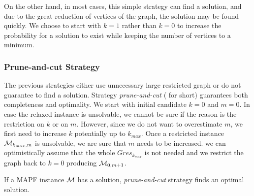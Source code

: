 

On the other hand, in most cases, this simple strategy can find a solution, and due to the great reduction of vertices of the graph, the solution may be found quickly. We choose to start with $k=1$ rather than $k=0$ to increase the probability for a solution to exist while keeping the number of vertices to a minimum.



\subsubsection{Prune-and-cut Strategy}

The previous strategies either use unnecessary large restricted graph or do not guarantee to find a solution. Strategy \emph{prune-and-cut} (\ssp{} for short) guarantees both completeness and optimality. We start with initial candidate $k=0$ and $m=0$. In case the relaxed instance is unsolvable, we cannot be sure if the reason is the restriction on $k$ or on $m$. However, since we do not want to overestimate $m$, we first need to increase $k$ potentially up to $k_{max}$. Once a restricted instance ${\mathcal{M}}_{k_{max},m}$ is unsolvable, we are sure that $m$ needs to be increased. %
we can optimistically assume that the whole $Gres_{k_{max}}$ is not needed and we restrict the graph back to $k=0$ producing ${\mathcal{M}}_{0,m+1}$.


\begin{prop}
If a MAPF instance $\mathcal{M}$ has a solution, \emph{prune-and-cut} strategy finds an optimal solution.~\cite{AAMAS_corridors}
\end{prop}



